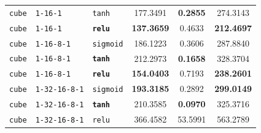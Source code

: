 \documentclass{article}
\begin{document}
\begin{table}[H]
\begin{tabular}{lllccc}
\texttt{cube} & \texttt{1-16-1} & \texttt{tanh} & 177.3491 & \textbf{0.2855} & 274.3143 \\
\texttt{cube} & \texttt{1-16-1} & \textbf{\texttt{relu}} & \textbf{137.3659} & 0.4633 & \textbf{212.4697} \\
\midrule
\texttt{cube} & \texttt{1-16-8-1} & \texttt{sigmoid} & 186.1223 & 0.3606 & 287.8840 \\
\texttt{cube} & \texttt{1-16-8-1} & \textbf{\texttt{tanh}} & 212.2973 & \textbf{0.1658} & 328.3704 \\
\texttt{cube} & \texttt{1-16-8-1} & \textbf{\texttt{relu}} & \textbf{154.0403} & 0.7193 & \textbf{238.2601} \\
\midrule
\texttt{cube} & \texttt{1-32-16-8-1} & \texttt{sigmoid} & \textbf{193.3185} & 0.2892 & \textbf{299.0149} \\
\texttt{cube} & \texttt{1-32-16-8-1} & \textbf{\texttt{tanh}} & 210.3585 & \textbf{0.0970} & 325.3716 \\
\texttt{cube} & \texttt{1-32-16-8-1} & \texttt{relu} & 366.4582 & 53.5991 & 563.2789 \\
\bottomrule
\end{tabular}
\end{table}
\end{document}
